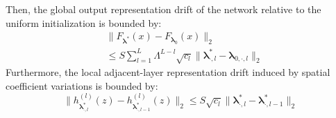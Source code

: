 \begin{theorem}
\begin{enumerate}
\end{enumerate}
Then, the global output representation drift of the network relative to the uniform initialization is bounded by:
\begin{align}
\label{eq:output_drift_bound}
&\|F_{\boldsymbol{\lambda}^*}(x) - F_{\boldsymbol{\lambda}_0}(x)\|_2 \nonumber \\
&\le S \sum_{l=1}^L \Lambda^{L-l} \sqrt{c_l} \|\boldsymbol{\lambda}^*_{\cdot, l} - \boldsymbol{\lambda}_{0, \cdot, l}\|_2
\end{align}
Furthermore, the local adjacent-layer representation drift induced by spatial coefficient variations is bounded by:
\begin{equation}
\label{eq:adjacent_drift_bound}
\|h^{(l)}_{\boldsymbol{\lambda}^*_{\cdot, l}}(z) - h^{(l)}_{\boldsymbol{\lambda}^*_{\cdot, l-1}}(z)\|_2 \le S \sqrt{c_l} \|\boldsymbol{\lambda}^*_{\cdot, l} - \boldsymbol{\lambda}^*_{\cdot, l-1}\|_2
\end{equation}
\end{theorem}

